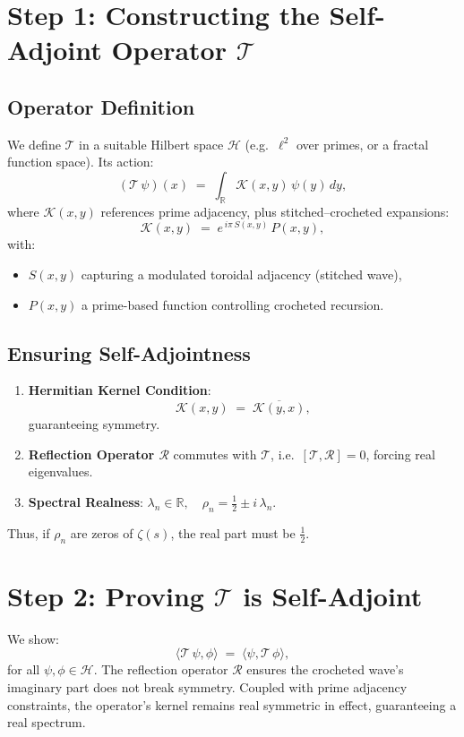 \documentclass[12pt]{article}
\begin{document}
\section{Step 1: Constructing the Self-Adjoint Operator \(\mathcal{T}\)}
\subsection{Operator Definition}
We define \(\mathcal{T}\) in a suitable Hilbert space \(\mathcal{H}\) (e.g.\ \(\ell^2\) over primes, or a fractal function space). Its action:
\[
(\mathcal{T}\,\psi)(x) \;=\;\int_{\mathbb{R}} \mathcal{K}(x,y)\,\psi(y)\,dy,
\]
where \(\mathcal{K}(x,y)\) references prime adjacency, plus stitched--crocheted expansions:
\[
\mathcal{K}(x,y) \;=\; e^{\,i\pi\,S(x,y)}\,P(x,y),
\]
with:
\begin{itemize}
    \item \(S(x,y)\) capturing a modulated toroidal adjacency (stitched wave),
    \item \(P(x,y)\) a prime-based function controlling crocheted recursion.
\end{itemize}

\subsection{Ensuring Self-Adjointness}
\begin{enumerate}
    \item \textbf{Hermitian Kernel Condition}: 
    \[
    \mathcal{K}(x,y) \;=\;\overline{\mathcal{K}(y,x)},
    \]
    guaranteeing symmetry. 
    \item \textbf{Reflection Operator \(\mathcal{R}\)} commutes with \(\mathcal{T}\), i.e.\ \([\mathcal{T},\mathcal{R}]=0\), forcing real eigenvalues.
    \item \textbf{Spectral Realness}:
    \(\lambda_n\in\mathbb{R},\quad\rho_n=\tfrac12 \pm i\,\lambda_n.\)
\end{enumerate}
Thus, if \(\rho_n\) are zeros of \(\zeta(s)\), the real part must be \(\tfrac12\).

\section{Step 2: Proving \(\mathcal{T}\) is Self-Adjoint}
We show:
\[
\langle \mathcal{T}\,\psi,\phi\rangle \;=\;\langle \psi,\mathcal{T}\,\phi\rangle,
\]
for all \(\psi,\phi\in\mathcal{H}\). The reflection operator \(\mathcal{R}\) ensures the crocheted wave's imaginary part does not break symmetry. Coupled with prime adjacency constraints, the operator’s kernel remains real symmetric in effect, guaranteeing a real spectrum.
\end{document}
